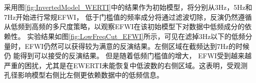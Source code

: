 $\quad$
$\quad$

$\quad$

采用图\ref{fig:InvertedModel_WERTI}中的结果作为初始模型，将分别从3Hz，5Hz和7Hz开始进行常规EFWI，
低于门槛值的频率成分将通过滤波切除，反演仍然遵循从低频到高频的多尺度策略，以观察EFWI在该初始模型下对数据中低频成分的依赖性。
实验结果如图\ref{fig:LowFreqCut_EFWI}所示，可见在滤掉3Hz以下的低频分量时，EFWI仍然可以获得较为满意的反演结果。左侧区域在截频达到7Hz的时候仍
能得到可以接受的反演结果。
但是随着低频门槛值的增大，
EFWI受到越来越严重的困扰，尤其是在EWERTI未能恢复中低波数的右侧区域。这表明，受观测孔径影响模型右侧比左侧更依赖数据中的低频信息。
\begin{figure}[!thb]
   \centering
   \\
   \\

\end{figure}
